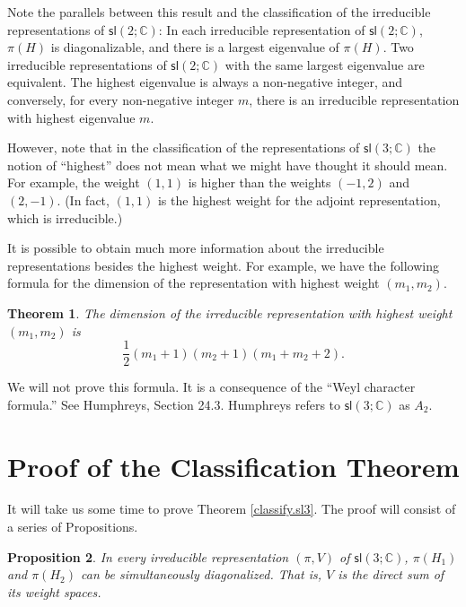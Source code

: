 \documentclass{amsbook}
\theoremstyle{plain}
\newtheorem{theorem}{Theorem}
\newtheorem{proposition}[theorem]{Proposition}
\numberwithin{equation}{chapter}
\numberwithin{theorem}{chapter}
\begin{document}
Note the parallels between this result and the classification of the
irreducible representations of $\mathsf{sl}(2;\mathbb{C})$: In each
irreducible representation of $\mathsf{sl}(2;\mathbb{C})$, $\pi(H)$ is
diagonalizable, and there is a largest eigenvalue of $\pi(H)$. Two irreducible
representations of $\mathsf{sl}(2;\mathbb{C})$ with the same largest
eigenvalue are equivalent. The highest eigenvalue is always a non-negative
integer, and conversely, for every non-negative integer $m$, there is an
irreducible representation with highest eigenvalue $m$.

However, note that in the classification of the representations of
$\mathsf{sl}\left(  3;\mathbb{C}\right)  $ the notion of ``highest'' does not
mean what we might have thought it should mean. For example, the weight
$(1,1)$ is higher than the weights $(-1,2)$ and $(2,-1)$. (In fact, $(1,1)$ is
the highest weight for the adjoint representation, which is irreducible.)

It is possible to obtain much more information about the irreducible
representations besides the highest weight. For example, we have the following
formula for the dimension of the representation with highest weight
$(m_{1},m_{2})$.

\begin{theorem}
The dimension of the irreducible representation with highest weight
$(m_{1},m_{2})$ is
\[
\frac{1}{2}(m_{1}+1)(m_{2}+1)(m_{1}+m_{2}+2)\text{.}%
\]
\end{theorem}

We will not prove this formula. It is a consequence of the ``Weyl character
formula.'' See Humphreys, Section 24.3. Humphreys refers to $\mathsf{sl}%
\left(  3;\mathbb{C}\right)  $ as $A_{2}$.

\section{Proof of the Classification Theorem}

It will take us some time to prove Theorem \ref{classify.sl3}. The proof will
consist of a series of Propositions.

\begin{proposition}
\label{sl3.weights}In every irreducible representation $\left(  \pi,V\right)
$ of $\mathsf{sl}\left(  3;\mathbb{C}\right)  $, $\pi(H_{1})$ and $\pi(H_{2})$
can be simultaneously diagonalized. That is, $V$ is the direct sum of its
weight spaces.
\end{proposition}
\end{document}

